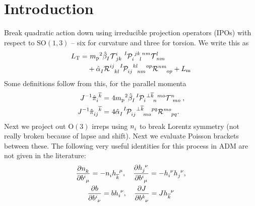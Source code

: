 \documentclass[aps,prd,reprint,preprintnumbers,superscriptaddress,showpacs,floatfix]{revtex4-2}
\begin{document}
\section{Introduction}
Break quadratic action down using irreducible projection operators (IPOs) with respect to $\mathrm{SO}(1,3)$ -- six for curvature and three for torsion. We write this as
\begin{equation}
\begin{aligned}
  L_{\text{T}}=&\ {m_\text{p}}^2\tensor{\hat{\beta}}{_I}\tensor{\mathcal{  T}}{^{i}_{jk}}\tensor[^I]{\mathcal{  P}}{_{i}^{jk}_{l}^{nm}}\tensor{\mathcal{  T}}{^{l}_{nm}}\\
  &+\tensor{\hat{\alpha}}{_I}\tensor{\mathcal{  R}}{^{ij}_{kl}}\tensor[^I]{\mathcal{  P}}{_{ij}^{kl}_{nm}^{op}}\tensor{\mathcal{  R}}{^{nm}_{op}}+L_{\text{m}}
  \label{<+label+>}
\end{aligned}
\end{equation}
Some definitions follow from this, for the parallel momenta
\begin{subequations}
  \begin{align}
    J^{-1}\tensor{\hat{\pi}}{_{i}^{\overline{k}}}=&\ 4{m_\text{p}}^2\tensor{\hat{\beta}}{_{I}}\tensor[^I]{\mathcal{  P}}{_i^{\perp\overline{k}}_n^{mo}}\tensor{\mathcal{  T}}{^n_{mo}},\\
    J^{-1}\tensor{\hat{\pi}}{_{ij}^{\overline{k}}}=&\ 4\tensor{\hat{\alpha}}{_{I}}\tensor[^I]{\mathcal{  P}}{_{ij}^{\perp\overline{k}}_{mo}^{pq}}\tensor{\mathcal{  R}}{^{mo}_{pq}}.
    \label{<+label+>}
  \end{align}
  \label{<+label+>}
\end{subequations}
Next we project out $\mathrm{O}(3)$ irreps using $\tensor{n}{_i}$ to break Lorentz symmetry (not really broken because of lapse and shift). Next we evaluate Poisson brackets between these. The following very useful identities for this process in ADM are not given in the literature: 
\begin{equation}
  \begin{gathered}
    \frac{\partial\tensor{n}{_k}}{\partial\tensor{b}{^i_\mu}}=-\tensor{n}{_i}\tensor{h}{_{\overline{k}}^\mu}, \quad \frac{\partial\tensor{h}{_j^\nu}}{\partial\tensor{b}{^i_\mu}}=-\tensor{h}{_i^\nu}\tensor{h}{_j^\nu},\\
    \frac{\partial b}{\partial\tensor{b}{^i_\nu}}=b\tensor{h}{_i^\nu}, \quad \frac{\partial J}{\partial\tensor{b}{^k_\nu}}=J\tensor{h}{_{\overline{k}}^\nu}
  \end{gathered}
  \label{<+label+>}
\end{equation}
\end{document}
